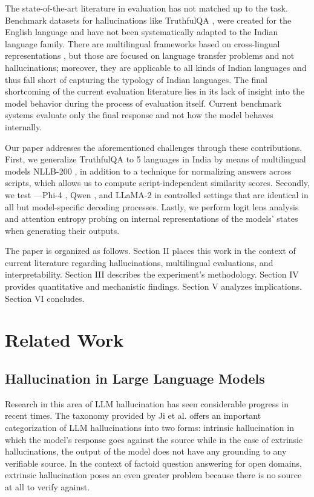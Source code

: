 \documentclass[conference]{IEEEtran}
\begin{document}
The state-of-the-art literature in evaluation has not matched
up to the task. Benchmark datasets for hallucinations like TruthfulQA  \cite{b1}, were created for the English language and have
not been systematically adapted to the Indian language family.
There are multilingual frameworks based on cross-lingual
representations \cite{b7}, but those are focused on language transfer problems and not hallucinations; moreover, they are
applicable to all kinds of Indian languages and thus fall short of capturing the typology of Indian languages. The final
shortcoming of the current evaluation literature lies in its lack of insight into the model behavior during the process
of evaluation itself. Current benchmark systems evaluate only
the final response and not how the model behaves internally.

Our paper addresses the aforementioned challenges through these contributions. First, we generalize TruthfulQA to 5 languages in India by means of multilingual models NLLB-200  \cite{b9}, in addition to a technique for normalizing answers across scripts, which allows us to compute script-independent similarity scores. Secondly, we test —Phi-4 \cite{b13}, Qwen \cite{b12}, and LLaMA-2 \cite{b10}in controlled settings that are identical in all but model-specific decoding processes. Lastly, we perform logit lens analysis \cite{b15} and attention entropy probing \cite{21} on internal representations of the models' states when generating their outputs.

The paper is organized as follows.
Section II places this work in the context of current literature regarding hallucinations,
multilingual evaluations, and interpretability. Section III describes the experiment’s methodology.
Section IV provides quantitative and mechanistic findings. Section V analyzes implications. Section VI concludes.

\section{Related Work}

\subsection{Hallucination in Large Language Models}

Research in this area of LLM hallucination has seen considerable
progress in recent times. The taxonomy provided by Ji et al. \cite{b2}
offers an important categorization of LLM hallucinations into two forms:
intrinsic hallucination in which the model’s response goes against
the source while in the case of extrinsic hallucinations, the output
of the model does not have any grounding to any verifiable source.
In the context of factoid question answering for open domains,
extrinsic hallucination poses an even greater problem because there
is no source at all to verify against.
\end{document}
